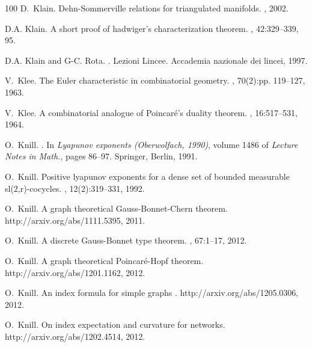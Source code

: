 \documentclass[12pt]{amsart}
\begin{document}
\begin{thebibliography}{100}
D.~Klain.
\newblock Dehn-{S}ommerville relations for triangulated manifolds.
, 2002.

D.A. Klain.
\newblock A short proof of hadwiger's characterization theorem.
, 42:329--339, 95.

D.A. Klain and G-C. Rota.
.
\newblock Lezioni Lincee. Accademia nazionale dei lincei, 1997.

V.~Klee.
\newblock The {E}uler characteristic in combinatorial geometry.
, 70(2):pp. 119--127, 1963.

V.~Klee.
\newblock A combinatorial analogue of {P}oincar{\'e}'s duality theorem.
, 16:517--531, 1964.

O.~Knill.
.
\newblock In {\em Lyapunov exponents ({Oberwolfach}, 1990)}, volume 1486 of
  {\em Lecture Notes in Math.}, pages 86--97. Springer, Berlin, 1991.

O.~Knill.
\newblock Positive lyapunov exponents for a dense set of bounded measurable
  sl(2,r)-cocycles.
, 12(2):319--331, 1992.

O.~Knill.
\newblock A graph theoretical {Gauss-Bonnet-Chern} theorem.
\newblock {\\}http://arxiv.org/abs/1111.5395, 2011.

O.~Knill.
\newblock A discrete {Gauss-Bonnet} type theorem.
, 67:1--17, 2012.

O.~Knill.
\newblock A graph theoretical {Poincar\'e-Hopf} theorem.
\newblock {\\} http://arxiv.org/abs/1201.1162, 2012.

O.~Knill.
\newblock An index formula for simple graphs \hfill.
\newblock {\\}http://arxiv.org/abs/1205.0306, 2012.

O.~Knill.
\newblock On index expectation and curvature for networks.
\newblock {\\}http://arxiv.org/abs/1202.4514, 2012.


\end{thebibliography}
\end{document}
